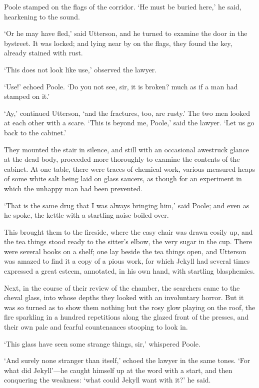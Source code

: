 \documentclass[]{novel}
\begin{document}
Poole stamped on the flags of the corridor. ‘He must be buried here,’ he said, hearkening to the sound.

‘Or he may have fled,’ said Utterson, and he turned to examine the door in the bystreet. It was locked; and lying near by on the flags, they found the key, already stained with rust.

‘This does not look like use,’ observed the lawyer.

‘Use!’ echoed Poole. ‘Do you not see, sir, it is broken? much as if a man had stamped on it.’

‘Ay,’ continued Utterson, ‘and the fractures, too, are rusty.’ The two men looked at each other with a scare. ‘This is beyond me, Poole,’ said the lawyer. ‘Let us go back to the cabinet.’

They mounted the stair in silence, and still with an occasional awestruck glance at the dead body, proceeded more thoroughly to examine the contents of the cabinet. At one table, there were traces of chemical work, various measured heaps of some white salt being laid on glass saucers, as though for an experiment in which the unhappy man had been prevented.

‘That is the same drug that I was always bringing him,’ said Poole; and even as he spoke, the kettle with a startling noise boiled over.

This brought them to the fireside, where the easy chair was drawn cosily up, and the tea things stood ready to the sitter’s elbow, the very sugar in the cup. There were several books on a shelf; one lay beside the tea things open, and Utterson was amazed to find it a copy of a pious work, for which Jekyll had several times expressed a great esteem, annotated, in his own hand, with startling blasphemies.

Next, in the course of their review of the chamber, the searchers came to the cheval glass, into whose depths they looked with an involuntary horror. But it was so turned as to show them nothing but the rosy glow playing on the roof, the fire sparkling in a hundred repetitions along the glazed front of the presses, and their own pale and fearful countenances stooping to look in.

‘This glass have seen some strange things, sir,’ whispered Poole.

‘And surely none stranger than itself,’ echoed the lawyer in the same tones. ‘For what did Jekyll’—he caught himself up at the word with a start, and then conquering the weakness: ‘what could Jekyll want with it?’ he said.
\end{document}
